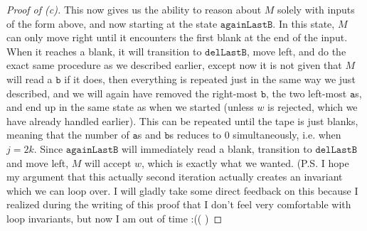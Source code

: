 \documentclass[11pt,a4paper]{article}
\begin{document}
\begin{proof}[Proof of (c)]
This now gives us the ability to reason about $M$ solely with inputs of the form above,
and now starting at the state $\texttt{againLastB}$. In this state, $M$ can
only move right until it encounters the first blank at the end of the input.
When it reaches a blank, it will transition to $\texttt{delLastB}$, move left,
and do the exact same procedure as we described earlier, except now it is not
given that $M$ will read a $\texttt{b}$ if it does, then everything is repeated
just in the same way we just described, and we will again have removed the
right-most $\texttt{b}$, the two left-most $\texttt{a}$s, and end up in the
same state as when we started (unless $w$ is rejected, which we have already
handled earlier). This can be repeated until the tape is just blanks, meaning
that the number of $\texttt{a}$s and $\texttt{b}$s reduces to $0$ simultaneously, i.e. when $j = 2k$. Since $\texttt{againLastB}$ will immediately read a blank, transition to
$\texttt{delLastB}$ and move left, $M$ will accept $w$, which is exactly what
we wanted. (P.S. I hope my argument that this actually second iteration actually creates an invariant which we can loop over. I will gladly take some direct feedback on this because I realized during the writing of this proof that I don't feel very comfortable with loop invariants, but now I am out of time :(( )
\end{proof}
\end{document}
